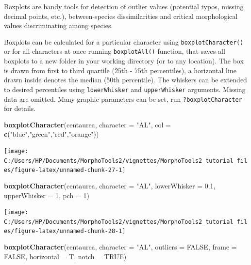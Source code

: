 \documentclass[
]{article}
\newenvironment{Shaded}{\begin{snugshade}}{\end{snugshade}}
\newcommand{\DataTypeTok}[1]{\textcolor[rgb]{0.13,0.29,0.53}{#1}}
\newcommand{\DecValTok}[1]{\textcolor[rgb]{0.00,0.00,0.81}{#1}}
\newcommand{\FloatTok}[1]{\textcolor[rgb]{0.00,0.00,0.81}{#1}}
\newcommand{\KeywordTok}[1]{\textcolor[rgb]{0.13,0.29,0.53}{\textbf{#1}}}
\newcommand{\NormalTok}[1]{#1}
\newcommand{\OtherTok}[1]{\textcolor[rgb]{0.56,0.35,0.01}{#1}}
\newcommand{\StringTok}[1]{\textcolor[rgb]{0.31,0.60,0.02}{#1}}
\begin{document}
Boxplots are handy tools for detection of outlier values (potential
typos, missing decimal points, etc.), between-species dissimilarities
and critical morphological values discriminating among species.

Boxplots can be calculated for a particular character using
\texttt{boxplotCharacter()} or for all characters at once running
\texttt{boxplotAll()} function, that saves all boxplots to a new folder
in your working directory (or to any location). The box is drawn from
first to third quartile (25th - 75th percentiles), a horizontal line
drawn inside denotes the median (50th percentile). The whiskers can be
extended to desired percentiles using \texttt{lowerWhisker} and
\texttt{upperWhisker} arguments. Missing data are omitted. Many graphic
parameters can be set, run \texttt{?boxplotCharacter} for details.

\begin{Shaded}
\begin{Highlighting}[]
\KeywordTok{boxplotCharacter}\NormalTok{(centaurea, }\DataTypeTok{character =} \StringTok{"AL"}\NormalTok{, }\DataTypeTok{col =} \KeywordTok{c}\NormalTok{(}\StringTok{"blue"}\NormalTok{,}\StringTok{"green"}\NormalTok{,}\StringTok{"red"}\NormalTok{,}\StringTok{"orange"}\NormalTok{))}
\end{Highlighting}
\end{Shaded}

\begin{center}\texttt{[image: C:/Users/HP/Documents/MorphoTools2/vignettes/MorphoTools2\_tutorial\_files/figure-latex/unnamed-chunk-27-1]} \end{center}

\begin{Shaded}
\begin{Highlighting}[]
\KeywordTok{boxplotCharacter}\NormalTok{(centaurea, }\DataTypeTok{character =} \StringTok{"AL"}\NormalTok{, }\DataTypeTok{lowerWhisker =} \FloatTok{0.1}\NormalTok{, }\DataTypeTok{upperWhisker =} \DecValTok{1}\NormalTok{, }\DataTypeTok{pch =} \DecValTok{1}\NormalTok{)}
\end{Highlighting}
\end{Shaded}

\begin{center}\texttt{[image: C:/Users/HP/Documents/MorphoTools2/vignettes/MorphoTools2\_tutorial\_files/figure-latex/unnamed-chunk-28-1]} \end{center}

\begin{Shaded}
\begin{Highlighting}[]
\KeywordTok{boxplotCharacter}\NormalTok{(centaurea, }\DataTypeTok{character =} \StringTok{"AL"}\NormalTok{, }\DataTypeTok{outliers =} \OtherTok{FALSE}\NormalTok{,}
                 \DataTypeTok{frame =} \OtherTok{FALSE}\NormalTok{, }\DataTypeTok{horizontal =}\NormalTok{ T, }\DataTypeTok{notch =} \OtherTok{TRUE}\NormalTok{)}
\end{Highlighting}
\end{Shaded}
\end{document}
